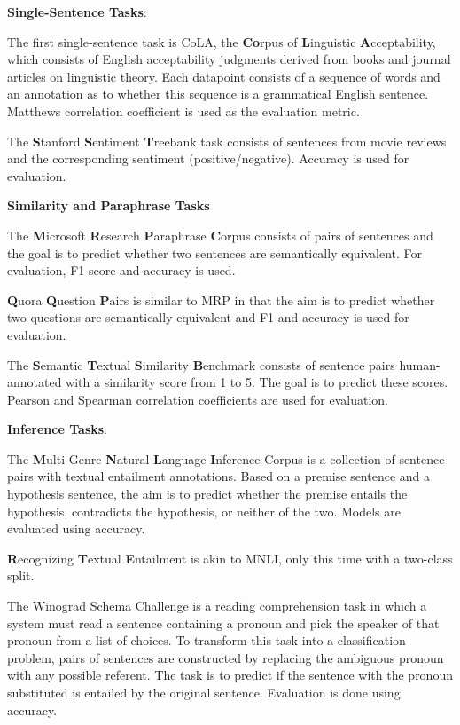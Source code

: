 \documentclass[]{krantz}
\begin{document}
\textbf{Single-Sentence Tasks}:

The first single-sentence task is CoLA, the \textbf{Co}rpus of \textbf{L}inguistic \textbf{A}cceptability, which consists of English acceptability judgments derived from books and journal articles on linguistic theory. Each datapoint consists of a sequence of words and an annotation as to whether this sequence is a grammatical English sentence. Matthews correlation coefficient is used as the evaluation metric.

The \textbf{S}tanford \textbf{S}entiment \textbf{T}reebank task consists of sentences from movie reviews and the corresponding sentiment (positive/negative). Accuracy is used for evaluation.

\textbf{Similarity and Paraphrase Tasks}

The \textbf{M}icrosoft \textbf{R}esearch \textbf{P}araphrase \textbf{C}orpus consists of pairs of sentences and the goal is to predict whether two sentences are semantically equivalent. For evaluation, F1 score and accuracy is used.

\textbf{Q}uora \textbf{Q}uestion \textbf{P}airs is similar to MRP in that the aim is to predict whether two questions are semantically equivalent and F1 and accuracy is used for evaluation.

The \textbf{S}emantic \textbf{T}extual \textbf{S}imilarity \textbf{B}enchmark consists of sentence pairs human-annotated with a similarity score from 1 to 5. The goal is to predict these scores. Pearson and Spearman correlation coefficients are used for evaluation.

\textbf{Inference Tasks}:

The \textbf{M}ulti-Genre \textbf{N}atural \textbf{L}anguage \textbf{I}nference Corpus is a collection of sentence pairs with textual entailment annotations. Based on a premise sentence and a hypothesis sentence, the aim is to predict whether the premise entails the hypothesis, contradicts the hypothesis, or neither of the two. Models are evaluated using accuracy.

\textbf{R}ecognizing \textbf{T}extual \textbf{E}ntailment is akin to MNLI, only this time with a two-class split.

The Winograd Schema Challenge is a reading comprehension task in which a system must read a sentence containing a pronoun and pick the speaker of that pronoun from a list of choices. To transform this task into a classification problem, pairs of sentences are constructed by replacing the ambiguous pronoun with any possible referent. The task is to predict if the sentence with the pronoun substituted is entailed by the original sentence. Evaluation is done using accuracy.
\end{document}
